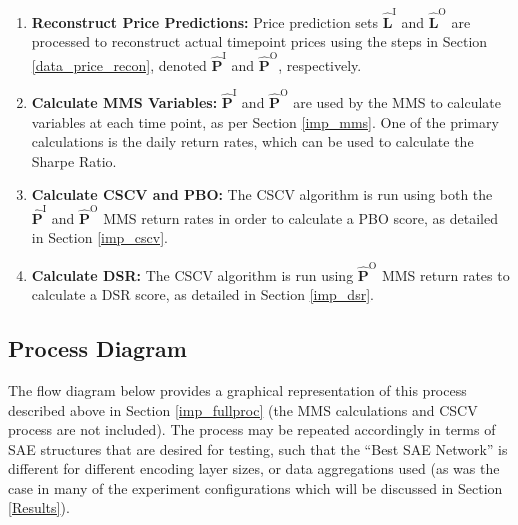 \documentclass[a4paper,11pt,oneside]{article}
\theoremstyle{plain}
\theoremstyle{definition}
\begin{document}
\begin{enumerate}
		\item \textbf{Reconstruct Price Predictions:} Price prediction sets $\mathbf{\hat{L}}^\mathrm{I}$ and $\mathbf{\hat{L}}^\mathrm{O}$ are processed to reconstruct actual timepoint prices using the steps in Section \ref{data_price_recon}, denoted $\mathbf{\hat{P}}^\mathrm{I}$ and $\mathbf{\hat{P}}^\mathrm{O}$, respectively.
		\item \textbf{Calculate MMS Variables:} $\mathbf{\hat{P}}^\mathrm{I}$ and $\mathbf{\hat{P}}^\mathrm{O}$ are used by the MMS to calculate variables at each time point, as per Section \ref{imp_mms}. One of the primary calculations is the daily return rates, which can be used to calculate the Sharpe Ratio.
		\item \textbf{Calculate CSCV and PBO:} The CSCV algorithm is run using both the $\mathbf{\hat{P}}^\mathrm{I}$ and $\mathbf{\hat{P}}^\mathrm{O}$ MMS return rates in order to calculate a PBO score, as detailed in Section \ref{imp_cscv}.
		\item \textbf{Calculate DSR:} The CSCV algorithm is run using $\mathbf{\hat{P}}^\mathrm{O}$ MMS return rates to calculate a DSR score, as detailed in Section \ref{imp_dsr}.
	\end{enumerate}
	
	
	\subsection{Process Diagram}\label{proc_diagram}
	
	The flow diagram below provides a graphical representation of this process described above in Section \ref{imp_fullproc} (the MMS calculations and CSCV process are not included). The process may be repeated accordingly in terms of SAE structures that are desired for testing, such that the ``Best SAE Network'' is different for different encoding layer sizes, or data aggregations used (as was the case in many of the experiment configurations which will be discussed in Section \ref{Results}).
	
\end{document}
